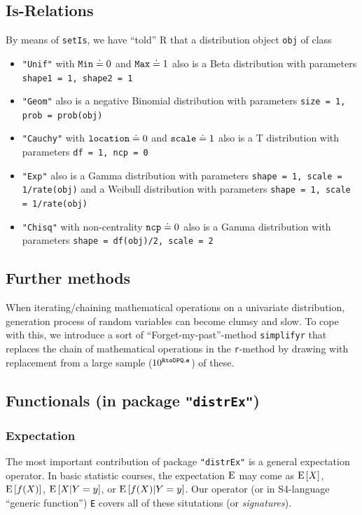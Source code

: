 \documentclass[11pt]{article}
\newcommand{\code}[1]{{\tt #1}}
\newcommand{\pkg}[1]{{\tt "#1"}}
\begin{document}
\subsection{Is-Relations}
%
By means of \code{setIs}, we have ``told'' {\sf R}  that a distribution object \code{obj} of class
\begin{itemize}
  \item  \code{"Unif"} with  $\code{Min} \doteq 0$ and  $\code{Max} \doteq 1$ also is
   a Beta distribution with parameters \code{shape1 = 1, shape2 = 1}
  \item  \code{"Geom"} also is a negative Binomial distribution with parameters
         \code{size = 1, prob = prob(obj)}
  \item \code{"Cauchy"} with $\code{location} \doteq 0$ and $\code{scale}\doteq 1$ also is a T distribution with parameters
         \code{df = 1, ncp = 0}
  \item \code{"Exp"} also is a Gamma distribution with parameters \code{shape = 1, scale = 1/rate(obj)} and
         a Weibull  distribution with parameters \code{shape = 1, scale = 1/rate(obj)}
  \item \code{"Chisq"} with non-centrality $\code{ncp}\doteq 0$ also is a Gamma distribution with parameters \code{shape = df(obj)/2, scale = 2}
\end{itemize}
%
\subsection{Further methods}
%
When iterating/chaining mathematical operations on a univariate distribution,
generation process of random variables can become clumsy and slow.
To cope with this, we introduce a sort of ``Forget-my-past''-method \code{simplifyr}
that replaces the  chain of mathematical operations in the \code{r}-method by drawing
with replacement from a large sample ($10^{\tt RtoDPQ.e}$) of these.
%
\subsection[Functionals (in package distrEx)]{Functionals (in package \pkg{distrEx})}\label{Functionals}
%
\subsubsection{Expectation}
The most important contribution of package \pkg{distrEx} is a general expectation operator.
In basic statistic courses, the expectation ${\rm E}$ may come as ${\rm E}\,[X]$, ${\rm E}\,[f(X)]$, ${\rm E}\,[X|Y=y]$,
or ${\rm E}\,[f(X)|Y=y]$. Our operator (or in S4-language ``generic function'') \code{E} covers all of
these situtations (or {\it signatures\/}).
\end{document}
